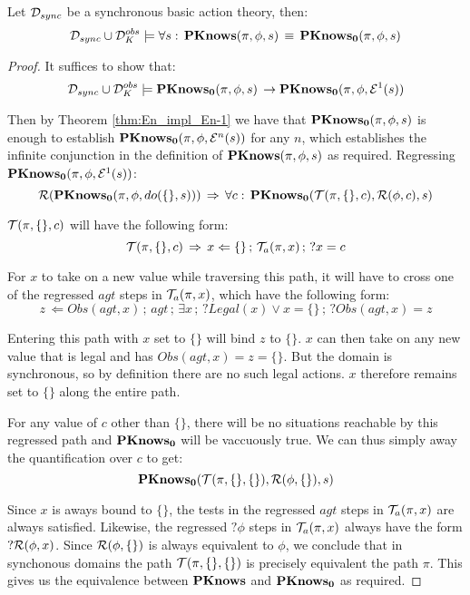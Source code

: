 \begin{thm}
Let $\mathcal{D}_{sync}$ be a synchronous basic action theory, then:\[
\mathcal{D}_{sync}\cup\mathcal{D}_{K}^{obs}\models\forall s:\,\mathbf{PKnows}(\pi,\phi,s)\,\equiv\,\mathbf{PKnows_{0}}(\pi,\phi,s)\]

\end{thm}
\begin{proof}
It suffices to show that:\[
\mathcal{D}_{sync}\cup\mathcal{D}_{K}^{obs}\models\mathbf{PKnows_{0}}(\pi,\phi,s)\,\rightarrow\mathbf{PKnows_{0}}(\pi,\phi,\mathcal{E}^{1}(s))\]


Then by Theorem \ref{thm:En_impl_En-1} we have that $\mathbf{PKnows_{0}}(\pi,\phi,s)$
is enough to establish $\mathbf{PKnows_{0}}(\pi,\phi,\mathcal{E}^{n}(s))$ for
any $n$, which establishes the infinite conjunction in the definition
of $\mathbf{PKnows}(\pi,\phi,s)$ as required. Regressing $\mathbf{PKnows_{0}}(\pi,\phi,\mathcal{E}^{1}(s))$:\[
\mathcal{R}(\mathbf{PKnows_{0}}(\pi,\phi,do(\{\},s)))\,\Rightarrow\,\forall c:\,\mathbf{PKnows_{0}}(\mathcal{T}(\pi,\{\},c),\mathcal{R}(\phi,c),s)\]


$\mathcal{T}(\pi,\{\},c)$ will have the following form:\[
\mathcal{T}(\pi,\{\},c)\,\Rightarrow\, x\Leftarrow\{\}\,;\,\mathcal{T}_{a}(\pi,x)\,;\,?x=c\]


For $x$ to take on a new value while traversing this path, it will
have to cross one of the regressed $agt$ steps in $\mathcal{T}_{a}(\pi,x)$,
which have the following form:\[
z\,\Leftarrow Obs(agt,x)\,;\, agt\,;\,\exists x\,;\,?Legal(x)\vee x=\{\}\,;\,?Obs(agt,x)=z\]


Entering this path with $x$ set to $\{\}$ will bind $z$ to $\{\}$.
$x$ can then take on any new value that is legal and has $Obs(agt,x)=z=\{\}$.
But the domain is synchronous, so by definition there are no such
legal actions. $x$ therefore remains set to $\{\}$ along the entire
path.

For any value of $c$ other than $\{\}$, there will be no situations
reachable by this regressed path and $\mathbf{PKnows_{0}}$ will be vaccuously
true. We can thus simply away the quantification over $c$ to get:\[
\mathbf{PKnows_{0}}(\mathcal{T}(\pi,\{\},\{\}),\mathcal{R}(\phi,\{\}),s)\]


Since $x$ is aways bound to $\{\}$, the tests in the regressed $agt$
steps in $\mathcal{T}_{a}(\pi,x)$ are always satisfied. Likewise, the regressed
$?\phi$ steps in $\mathcal{T}_{a}(\pi,x)$ always have the form $?\mathcal{R}(\phi,x)$.
Since $\mathcal{R}(\phi,\{\})$ is always equivalent to $\phi$, we conclude
that in synchonous domains the path $\mathcal{T}(\pi,\{\},\{\})$ is precisely
equivalent the path $\pi$. This gives us the equivalence between
$\mathbf{PKnows}$ and $\mathbf{PKnows_{0}}$ as required. 
\end{proof}

